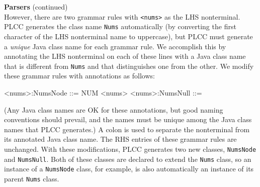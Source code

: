 \begin{minipage}[t]{\sw}
\slidenumber
\LARGE
{\bf Parsers} (continued)\exx
\Large
\emm\LightBox{\MYlon}\vspace{1.5ex}\\
However, there are two grammar rules with \verb'<nums>'
as the LHS nonterminal.
PLCC generates the class name \verb'Nums' automatically
(by converting the first character of the LHS nonterminal name to uppercase),
but PLCC must generate a
{\em unique} Java class name for each grammar rule.
We accomplish this by annotating the LHS nonterminal
on each of these lines with a Java class name
that is different from \verb'Nums'
and that distinguishes one from the other.
We modify these grammar rules with annotations as follows:
\begin{qv}
<nums>:NumsNode  ::= NUM <nums>
<nums>:NumsNull  ::=
\end{qv}
(Any Java class names are OK for these annotations,
but good naming conventions should prevail,
and the names must be unique
among the Java class names that PLCC generates.)
A colon is used to separate the nonterminal
from its annotated Java class name.
The RHS entries of these grammar rules are unchanged.\exx
With these modifications, PLCC generates
two new classes, \verb'NumsNode' and \verb'NumsNull'.
Both of these classes are declared to extend the \verb'Nums' class,
so an instance of a \verb'NumsNode' class, for example,
is also automatically an instance of its parent \verb'Nums' class.
\end{minipage}
\clearpage
